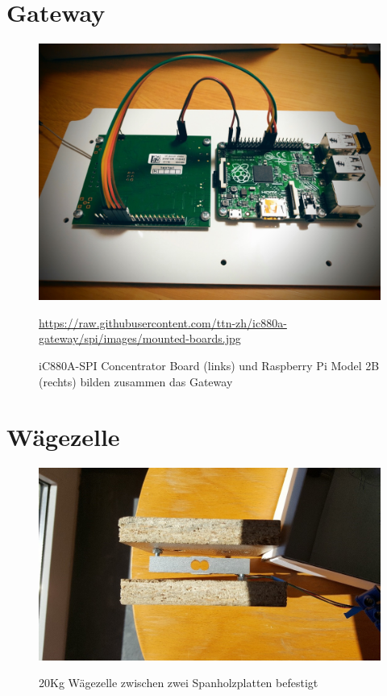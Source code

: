 \section{Gateway}
\begin{figure}[ht]
    \center
    \includegraphics[width=15cm]{Bilder/mounted-boards.jpg}\\
    \caption{iC880A-SPI Concentrator Board (links) und Raspberry Pi Model 2B (rechts) bilden zusammen das Gateway}
    \begin{flushleft}
        \quelle\url{https://raw.githubusercontent.com/ttn-zh/ic880a-gateway/spi/images/mounted-boards.jpg}
    \end{flushleft}
    \label{fig:UeberblickDerBauteile}
\end{figure}
\newpage
\section{Wägezelle}
\begin{figure}[ht]
    \center
    \includegraphics[width=15cm]{Bilder/waegezelle.jpg}\\
    \caption{20Kg Wägezelle zwischen zwei Spanholzplatten befestigt}
    \label{fig:Waegezelle}
\end{figure}
\newpage
